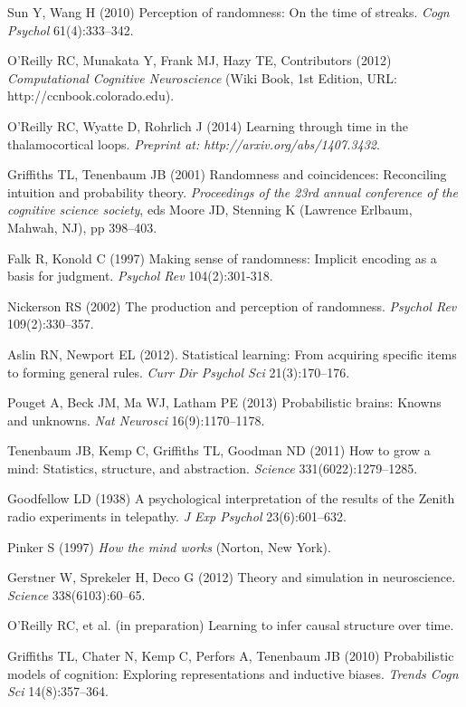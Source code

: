 \documentclass{pnastwo}
\begin{document}
\begin{article}
\begin{thebibliography}{10}
Sun Y, Wang H (2010) Perception of randomness: On the time of streaks. {\em Cogn Psychol} 61(4):333--342.

O'Reilly RC, Munakata Y, Frank MJ, Hazy TE, Contributors (2012) {\em
  Computational Cognitive Neuroscience} (Wiki Book, 1st Edition, URL:
  http://ccnbook.colorado.edu).

O'Reilly RC, Wyatte D, Rohrlich J (2014) Learning through time in the thalamocortical loops. {\em Preprint at: http://arxiv.org/abs/1407.3432\/}.

Griffiths TL, Tenenbaum JB (2001) Randomness and coincidences: Reconciling intuition and probability theory. {\em Proceedings of the 23rd annual conference of the cognitive science society}, eds Moore JD, Stenning K (Lawrence Erlbaum, Mahwah, NJ), pp 398--403.

Falk R, Konold C (1997) Making sense of randomness: Implicit encoding as a basis for judgment. {\em Psychol Rev} 104(2):301-318.

Nickerson RS (2002) The production and perception of randomness. {\em Psychol Rev} 109(2):330--357.

Aslin RN, Newport EL (2012). Statistical learning: From acquiring specific items to forming general rules. {\em Curr Dir Psychol Sci} 21(3):170--176.

Pouget A, Beck JM, Ma WJ, Latham PE (2013) Probabilistic brains: Knowns and unknowns. {\em Nat Neurosci} 16(9):1170--1178.

Tenenbaum JB, Kemp C, Griffiths TL, Goodman ND (2011) How to grow a mind: Statistics, structure, and abstraction. {\em Science} 331(6022):1279--1285.

Goodfellow LD (1938) A psychological interpretation of the results of the Zenith radio experiments in telepathy. {\em J Exp Psychol} 23(6):601--632.

Pinker S (1997) {\em How the mind works} (Norton, New York).

Gerstner W, Sprekeler H, Deco G (2012) Theory and simulation in neuroscience. {\em Science} 338(6103):60--65.

O'Reilly RC, {et al.}  (in preparation) Learning to infer causal structure over time.

Griffiths TL, Chater N, Kemp C, Perfors A, Tenenbaum JB (2010) Probabilistic models of cognition: Exploring representations and inductive biases. {\em Trends Cogn Sci} 14(8):357--364.
\end{thebibliography}

\end{article}
\end{document}
